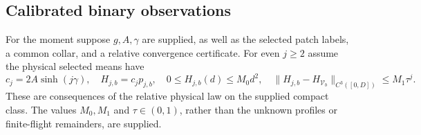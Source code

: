 \subsection{Calibrated binary observations}
For the moment suppose $g,A,\gamma$ are supplied, as well as the
selected patch labels, a common collar, and a relative convergence
certificate. For even $j\ge2$ assume the physical selected means have
\begin{equation}\label{eq:v12-physical-assumptions}
 c_j=2A\sinh(j\gamma),\quad H_{j,b}=c_jp_{j,b},\quad
 0\le H_{j,b}(d)\le M_0d^2,\quad
 \|H_{j,b}-H_{\mathcal V_b}\|_{C^3([0,D])}\le M_1\tau^j.
\end{equation}
These are consequences of the relative physical law on the supplied
compact class. The values $M_0,M_1$ and $\tau\in(0,1)$, rather
than the unknown profiles or finite-flight remainders, are supplied.

